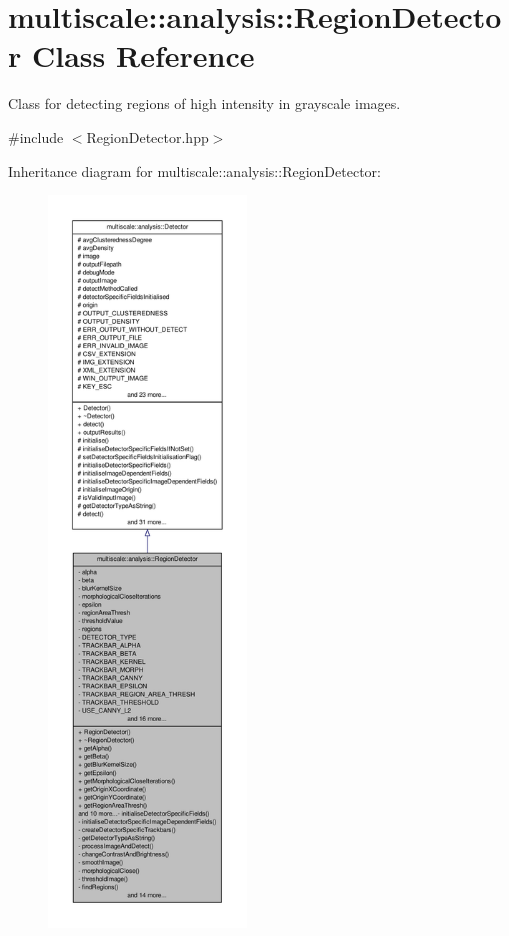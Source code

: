 \hypertarget{classmultiscale_1_1analysis_1_1RegionDetector}{\section{multiscale\-:\-:analysis\-:\-:\-Region\-Detector \-Class \-Reference}
\label{classmultiscale_1_1analysis_1_1RegionDetector}
}


\-Class for detecting regions of high intensity in grayscale images.  




{\ttfamily \#include $<$\-Region\-Detector.\-hpp$>$}



\-Inheritance diagram for multiscale\-:\-:analysis\-:\-:\-Region\-Detector\-:\nopagebreak
\begin{figure}[H]
\begin{center}
\leavevmode
\includegraphics[height=550pt]{classmultiscale_1_1analysis_1_1RegionDetector__inherit__graph}
\end{center}
\end{figure}
